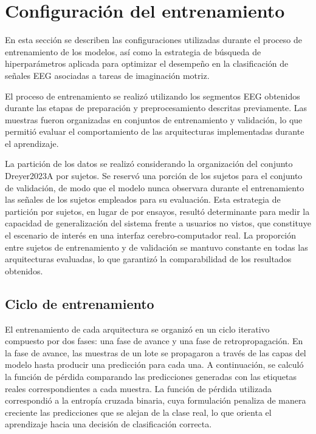 \FloatBarrier

\section{Configuración del entrenamiento}

En esta sección se describen las configuraciones utilizadas durante el proceso de entrenamiento de los modelos, así como la estrategia de búsqueda de hiperparámetros aplicada para optimizar el desempeño en la clasificación de señales EEG asociadas a tareas de imaginación motriz.

El proceso de entrenamiento se realizó utilizando los segmentos EEG obtenidos durante las etapas de preparación y preprocesamiento descritas previamente. Las muestras fueron organizadas en conjuntos de entrenamiento y validación, lo que permitió evaluar el comportamiento de las arquitecturas implementadas durante el aprendizaje.

La partición de los datos se realizó considerando la organización del conjunto Dreyer2023A por sujetos. Se reservó una porción de los sujetos para el conjunto de validación, de modo que el modelo nunca observara durante el entrenamiento las señales de los sujetos empleados para su evaluación. Esta estrategia de partición por sujetos, en lugar de por ensayos, resultó determinante para medir la capacidad de generalización del sistema frente a usuarios no vistos, que constituye el escenario de interés en una interfaz cerebro-computador real. La proporción entre sujetos de entrenamiento y de validación se mantuvo constante en todas las arquitecturas evaluadas, lo que garantizó la comparabilidad de los resultados obtenidos.

\subsection{Ciclo de entrenamiento}

El entrenamiento de cada arquitectura se organizó en un ciclo iterativo compuesto por dos fases: una fase de avance y una fase de retropropagación. En la fase de avance, las muestras de un lote se propagaron a través de las capas del modelo hasta producir una predicción para cada una. A continuación, se calculó la función de pérdida comparando las predicciones generadas con las etiquetas reales correspondientes a cada muestra. La función de pérdida utilizada correspondió a la entropía cruzada binaria, cuya formulación penaliza de manera creciente las predicciones que se alejan de la clase real, lo que orienta el aprendizaje hacia una decisión de clasificación correcta.

